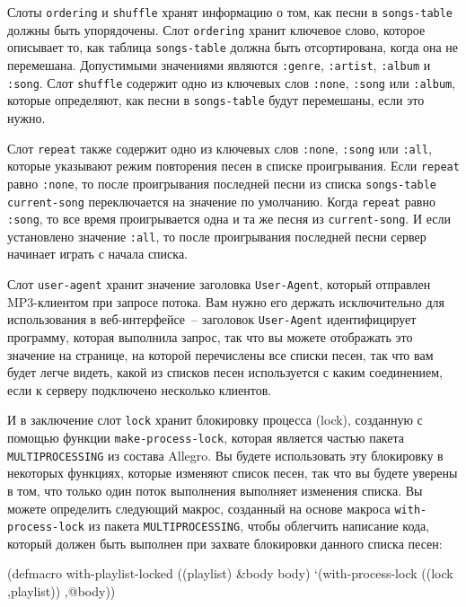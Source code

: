Слоты \lstinline{ordering} и \lstinline{shuffle} хранят информацию о том, как песни в
\lstinline{songs-table} должны быть упорядочены.  Слот \lstinline{ordering} хранит ключевое слово,
которое описывает то, как таблица \lstinline{songs-table} должна быть отсортирована, когда она
не перемешана. Допустимыми значениями являются \lstinline{:genre}, \lstinline{:artist},
\lstinline{:album} и \lstinline{:song}.  Слот \lstinline{shuffle} содержит одно из ключевых слов
\lstinline{:none}, \lstinline{:song} или \lstinline{:album}, которые определяют, как песни в
\lstinline{songs-table} будут перемешаны, если это нужно.

Слот \lstinline{repeat} также содержит одно из ключевых слов \lstinline{:none}, \lstinline{:song} или
\lstinline{:all}, которые указывают режим повторения песен в списке проигрывания.  Если
\lstinline{repeat} равно \lstinline{:none}, то после проигрывания последней песни из списка
\lstinline{songs-table} \lstinline{current-song} переключается на значение по умолчанию. Когда
\lstinline{repeat} равно \lstinline{:song}, то все время проигрывается одна и та же песня из
\lstinline{current-song}.  И если установлено значение \lstinline{:all}, то после проигрывания
последней песни сервер начинает играть с начала списка.

Слот \lstinline{user-agent} хранит значение заголовка \lstinline{User-Agent}, который отправлен
MP3-клиентом при запросе потока.  Вам нужно его держать исключительно для использования в
веб-интерфейсе~-- заголовок \lstinline{User-Agent} идентифицирует программу, которая выполнила
запрос, так что вы можете отображать это значение на странице, на которой перечислены все
списки песен, так что вам будет легче видеть, какой из списков песен используется с каким
соединением, если к серверу подключено несколько клиентов.

И в заключение слот \lstinline{lock} хранит блокировку процесса (lock), созданную с
помощью функции \lstinline{make-process-lock}, которая является частью пакета
\lstinline{MULTIPROCESSING} из состава Allegro.  Вы будете использовать эту блокировку в
некоторых функциях, которые изменяют список песен, так что вы будете уверены в том, что
только один поток выполнения выполняет изменения списка.  Вы можете определить следующий
макрос, созданный на основе макроса \lstinline{with-process-lock} из пакета
\lstinline{MULTIPROCESSING}, чтобы облегчить написание кода, который должен быть выполнен при
захвате блокировки данного списка песен:

\begin{myverb}
(defmacro with-playlist-locked ((playlist) &body body)
  `(with-process-lock ((lock ,playlist))
     ,@body))
\end{myverb}

